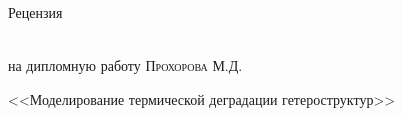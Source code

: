 \documentclass[utf8, 14pt]{G7-32}
\begin{document}
\frontmatter
\begin{center}
	\begin{LARGE}
		Рецензия
	\end{LARGE}\\
	 на дипломную работу \textsc{Прохорова М.Д.}\\
	 \begin{large}
	 <<Моделирование термической деградации гетероструктур>>
	 \end{large}
\end{center}
\end{document}
